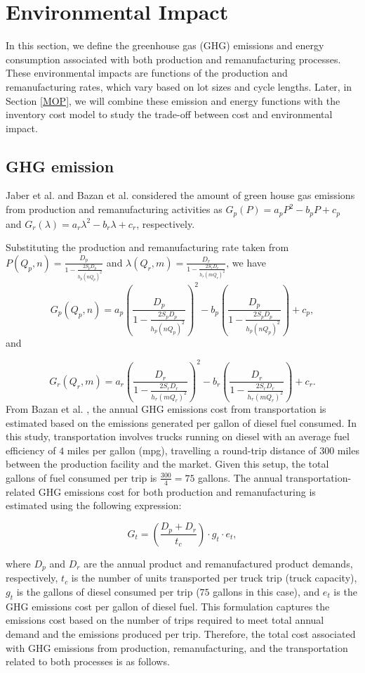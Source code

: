 \documentclass[11pt]{article}
\newcommand{\ds}{\displaystyle}
\begin{document}
\section{Environmental Impact}\label{EnvImp}
In this section, we define the greenhouse gas (GHG) emissions and energy consumption associated with both production and remanufacturing processes. These environmental impacts are functions of the production and remanufacturing rates, which vary based on lot sizes and cycle lengths. Later, in Section \ref{MOP}, we will combine these emission and energy functions with the inventory cost model to study the trade-off between cost and environmental impact.

\subsection{GHG emission}
Jaber et al. \cite{Jaber2013a} and Bazan et al. \cite{Bazan2015, Bazan2016} considered the amount of green house gas emissions from production and remanufacturing activities as $G_p(P)=a_p P^2 - b_p P + c_p$ and $G_r(\lambda)=a_r \lambda^2 - b_r \lambda + c_r$, respectively.

\noindent Substituting the production and remanufacturing rate taken from \cite{Bazan2016}
\(\ds P(Q_p, n) = \frac{D_p}{1 - \frac{2S_pD_p}{h_p(nQ_p)^2}}\)
and \(\ds \lambda(Q_r, m) = \frac{D_r}{1 - \frac{2S_rD_r}{h_r(mQ_r)^2}}\), we have
$$
G_p(Q_p, n) = a_p \left(\frac{D_p}{1 - \frac{2S_pD_p}{h_p(nQ_p)^2}}\right)^2 - b_p \left(\frac{D_p}{1 - \frac{2S_pD_p}{h_p(nQ_p)^2}}\right) + c_p,
$$
and

$$
G_r(Q_r, m) = a_r \left(\frac{D_r}{1 - \frac{2S_rD_r}{h_r(mQ_r)^2}}\right)^2 - b_r \left(\frac{D_r}{1 - \frac{2S_rD_r}{h_r(mQ_r)^2}}\right) + c_r.
$$
From Bazan et al. \cite{Bazan2015}, the annual GHG emissions cost from transportation is estimated based on the emissions generated per gallon of diesel fuel consumed. In this study, transportation involves trucks running on diesel with an average fuel efficiency of $4$ miles per gallon (mpg), travelling a round-trip distance of $300$ miles between the production facility and the market. Given this setup, the total gallons of fuel consumed per trip is $\ds \frac{300}{4} = 75$ gallons. The annual transportation-related GHG emissions cost for both production and remanufacturing is estimated using the following expression:

$$
G_t = \left( \frac{D_p + D_r}{t_c} \right) \cdot g_t \cdot e_t,
$$

\noindent where $D_p$ and $D_r$ are the annual product and remanufactured product demands, respectively, $t_c$ is the number of units transported per truck trip (truck capacity), $g_t$ is the gallons of diesel consumed per trip ($75$ gallons in this case), and $e_t$ is the GHG emissions cost per gallon of diesel fuel. This formulation captures the emissions cost based on the number of trips required to meet total annual demand and the emissions produced per trip. Therefore, the total cost associated with GHG emissions from production, remanufacturing, and the transportation related to both processes is as follows.
\end{document}
